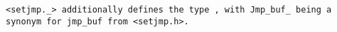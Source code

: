 \tt{<setjmp._>} additionally defines the type , with
\tt{Jmp_buf_} being a synonym for \tt{jmp_buf} from \tt{<setjmp.h>}.
